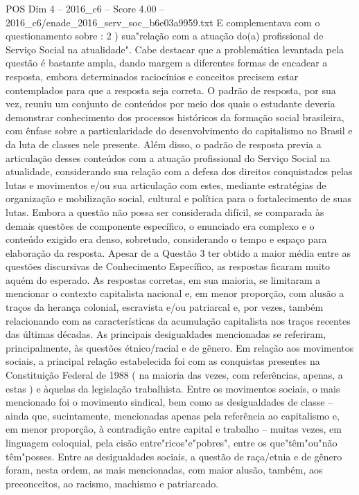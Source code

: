 \begin{textsample}{POS Dim 4 – 2016\_c6 – Score 4.00 – 2016\_c6/enade\_2016\_serv\_soc\_b6e03a9959.txt}
E complementava com o questionamento sobre : 2 ) sua"relação com a atuação do(a) profissional de Serviço Social na atualidade".
Cabe destacar que a problemática levantada pela questão é bastante ampla, dando margem a diferentes formas de encadear a resposta, embora determinados raciocínios e conceitos precisem estar contemplados para que a resposta seja correta.
O padrão de resposta, por sua vez, reuniu um conjunto de conteúdos por meio dos quais o estudante deveria demonstrar conhecimento dos processos históricos da formação social brasileira, com ênfase sobre a particularidade do desenvolvimento do capitalismo no Brasil e da luta de classes nele presente.
Além disso, o padrão de resposta previa a articulação desses conteúdos com a atuação profissional do Serviço Social na atualidade, considerando sua relação com a defesa dos direitos conquistados pelas lutas e movimentos e/ou sua articulação com estes, mediante estratégias de organização e mobilização social, cultural e política para o fortalecimento de suas lutas.
Embora a questão não possa ser considerada difícil, se comparada às demais questões de componente específico, o enunciado era complexo e o conteúdo exigido era denso, sobretudo, considerando o tempo e espaço para elaboração da resposta.
Apesar de a Questão 3 ter obtido a maior média entre as questões discursivas de Conhecimento Específico, as respostas ficaram muito aquém do esperado.
As respostas corretas, em sua maioria, se limitaram a mencionar o contexto capitalista nacional e, em menor proporção, com alusão a traços da herança colonial, escravista e/ou patriarcal e, por vezes, também relacionando com as características da acumulação capitalista nos traços recentes das últimas décadas.
As principais desigualdades mencionadas se referiram, principalmente, às questões étnico/racial e de gênero.
Em relação aos movimentos sociais, a principal relação estabelecida foi com as conquistas presentes na Constituição Federal de 1988 ( na maioria das vezes, com referências, apenas, a estas ) e àquelas da legislação trabalhista.
Entre os movimentos sociais, o mais mencionado foi o movimento sindical, bem como as desigualdades de classe – ainda que, sucintamente, mencionadas apenas pela referência ao capitalismo e, em menor proporção, à contradição entre capital e trabalho – muitas vezes, em linguagem coloquial, pela cisão entre"ricos"e"pobres", entre os que"têm"ou"não têm"posses.
Entre as desigualdades sociais, a questão de raça/etnia e de gênero foram, nesta ordem, as mais mencionadas, com maior alusão, também, aos preconceitos, ao racismo, machismo e patriarcado.

\end{textsample}

